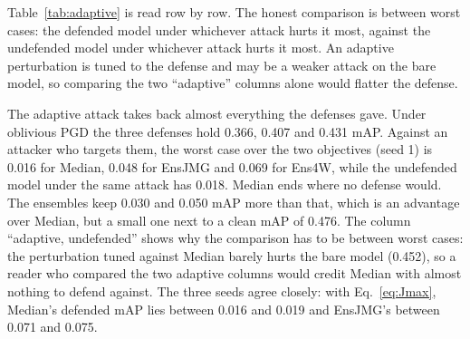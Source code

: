 \documentclass[11pt]{article}
\newcommand{\yw}{YOLO-World}
\begin{document}
\begin{table}[t]
\centering\small
\caption{\yw{} under oblivious and adaptive PGD, first 1{,}000 images,
$\epsilon=7/255$, 50 steps; clean mAP 0.476. Each row is one target defense;
the adaptive attack is computed against that defense. The first five columns
use the objective of Eq.~\ref{eq:Jmax}; Median and EnsJMG are the mean over
three seeds (standard deviation), Ens4W is one seed. The last column is the
adaptive attack with the average objective (seed 1); for a single transform
the two objectives coincide. Both attacks optimize at the original
resolution (Sec.~\ref{sec:adaptive-method}), so the oblivious columns are not
those of Table~\ref{tab:ci-yolo}.}
\label{tab:adaptive}
\end{table}

Table~\ref{tab:adaptive} is read row by row. The honest comparison is between
worst cases: the defended model under whichever attack hurts it most, against
the undefended model under whichever attack hurts it most. An adaptive
perturbation is tuned to the defense and may be a weaker attack on the bare
model, so comparing the two ``adaptive'' columns alone would flatter the
defense.

The adaptive attack takes back almost everything the defenses gave. Under
oblivious PGD the three defenses hold 0.366, 0.407 and 0.431 mAP. Against an
attacker who targets them, the worst case over the two objectives (seed 1)
is 0.016 for Median, 0.048 for EnsJMG and 0.069 for Ens4W, while the
undefended model under the same attack has 0.018. Median ends where no
defense would. The ensembles keep 0.030 and 0.050 mAP more than that, which
is an advantage over Median, but a small one next to a clean mAP of 0.476.
The column ``adaptive, undefended'' shows why the comparison has to be
between worst cases: the perturbation tuned against Median barely hurts the
bare model (0.452), so a reader who compared the two adaptive columns would
credit Median with almost nothing to defend against. The three seeds agree
closely: with Eq.~\ref{eq:Jmax}, Median's defended mAP lies between 0.016
and 0.019 and EnsJMG's between 0.071 and 0.075.
\end{document}
